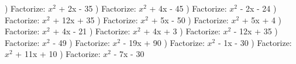 \documentclass{article}%
\begin{document}
\newline%
) Factorize: $x^2$ + 2x - 35%
\newline%
\newline%
) Factorize: $x^2$ + 4x - 45%
\newline%
\newline%
) Factorize: $x^2$ - 2x - 24%
\newline%
\newline%
) Factorize: $x^2$ + 12x + 35%
\newline%
\newline%
) Factorize: $x^2$ + 5x - 50%
\newline%
\newline%
) Factorize: $x^2$ + 5x + 4%
\newline%
\newline%
) Factorize: $x^2$ + 4x - 21%
\newline%
\newline%
) Factorize: $x^2$ + 4x + 3%
\newline%
\newline%
) Factorize: $x^2$ - 12x + 35%
\newline%
\newline%
) Factorize: $x^2$ - 49%
\newline%
\newline%
) Factorize: $x^2$ - 19x + 90%
\newline%
\newline%
) Factorize: $x^2$ - 1x - 30%
\newline%
\newline%
) Factorize: $x^2$ + 11x + 10%
\newline%
\newline%
) Factorize: $x^2$ - 7x - 30%
\newline%
\newline%
\newline%
\end{document}

